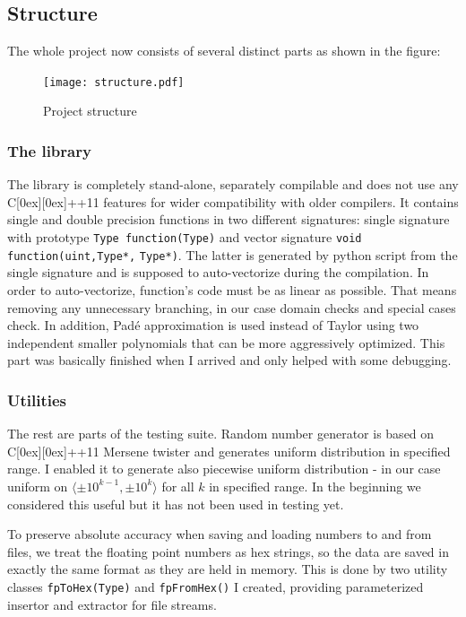 \documentclass[oneside,10pt,a4paper]{article}
\newcommand{\Cpp}{C\raisebox{0.15ex}[0ex][0ex]{++}}
\begin{document}
\subsection{Structure}
The whole project now consists of several distinct parts as shown in the figure:

\begin{figure}[h]\label{structure}
  \texttt{[image: structure.pdf]}
  \caption{Project structure}
\end{figure}

\subsubsection{The library}
The library is completely stand-alone, separately compilable and does not use any \Cpp 11 features for wider compatibility with older compilers. It contains single and double precision functions in two different signatures: single signature with prototype {\tt Type function(Type)} and vector signature {\tt void function(uint,Type*,} {\tt Type*)}. The latter is generated by python script from the single signature and is supposed to auto-vectorize during the compilation. In order to auto-vectorize, function's code must be as linear as possible. That means removing any unnecessary branching, in our case domain checks and special cases check. In addition, Padé approximation is used instead of Taylor using two independent smaller polynomials that can be more aggressively optimized. This part was basically finished when I arrived and only helped with some debugging.

\subsubsection{Utilities}
The rest are parts of the testing suite. Random number generator is based on \Cpp 11 Mersene twister and generates uniform distribution in specified range. I enabled it to generate also piecewise uniform distribution - in our case uniform on $\langle\pm 10^{k-1},\pm 10^k\rangle$ for all $k$ in specified range. In the beginning we considered this useful but it has not been used in testing yet.

To preserve absolute accuracy when saving and loading numbers to and from files, we treat the floating point numbers as hex strings, so the data are saved in exactly the same format as they are held in memory. This is done by two utility classes {\tt fpToHex(Type)} and {\tt fpFromHex()} I created, providing parameterized insertor and extractor for file streams.
\end{document}

